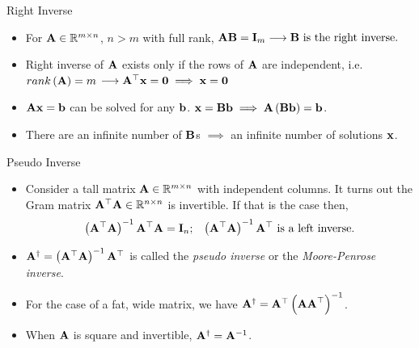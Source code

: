 \documentclass[aspectratio=169]{beamer}
\let\olditem\item
\renewcommand{\item}{\setlength{\itemsep}{\fill}\olditem}
\def\mf{\ensuremath\mathbf}
\def\mb{\ensuremath\mathbb}
\begin{document}
\begin{frame}[t]{Right Inverse}
\begin{itemize}
    \item For $\mf{A} \in \mb{R}^{m \times n}$, $n > m$ with full rank, $\mf{AB} = \mf{I}_m \longrightarrow \mf{B} \text{ is the right inverse.}$

    \item Right inverse of $\mf{A}$ exists only if the rows of $\mf{A}$ are independent, i.e. $rank\left(\mf{A}\right) = m$ $\longrightarrow \mf{A}^\top\mf{x} = \mf{0} \implies \mf{x} = \mf{0}$

    \item $\mf{Ax} = \mf{b}$ can be solved for any $\mf{b}$. $\mf{x} = \mf{Bb} \implies \mf{A}\left(\mf{Bb}\right) = \mf{b}$. 

    \item There are an infinite number of $\mf{B}$s $\implies$ an infinite number of solutions $\mf{x}$.
\end{itemize}
\end{frame}


\begin{frame}[t]{Pseudo Inverse}
\begin{itemize}
    \item Consider a tall matrix $\mf{A} \in \mb{R}^{m \times n}$ with independent columns. It turns out the Gram matrix $\mf{A}^\top\mf{A} \in \mb{R}^{n \times n}$ is invertible. If that is the case then,
    \[ \left(\mf{A}^\top\mf{A}\right)^{-1}\mf{A}^\top\mf{A} = \mf{I}_n; \,\,\,\,\, \left(\mf{A}^\top\mf{A}\right)^{-1}\mf{A}^\top \text{ is a left inverse.} \]
    \item $\mf{A}^{\dagger} = \left(\mf{A}^\top\mf{A}\right)^{-1}\mf{A}^\top$ is called the \textit{pseudo inverse} or the \textit{Moore-Penrose inverse}.

    \item For the case of a fat, wide matrix, we have $\mf{A}^{\dagger} = \mf{A}^\top\left(\mf{AA}^\top\right)^{-1}$.

    \item When $\mf{A}$ is square and invertible, $\mf{A}^{\dagger} = \mf{A}^{-1}$.
\end{itemize}
\end{frame}


\end{document}
